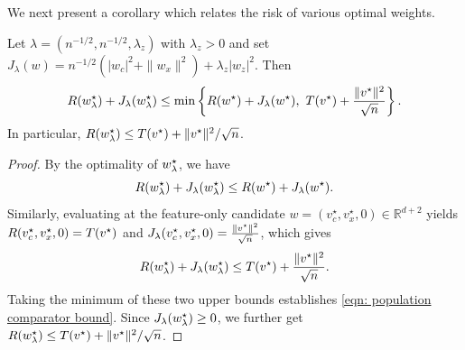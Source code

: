 We next present a corollary which relates the risk of various optimal weights.
\begin{cor}\label{cor: v star and w star infinity}
Let $\lambda=(n^{-1/2},n^{-1/2},\lambda_z)$ with $\lambda_z>0$ and set
$J_\lambda(w)=n^{-1/2}(|w_c|^2+\|w_x\|^2)+\lambda_z|w_z|^2$.
Then
\begin{equation}\label{eqn: population comparator bound}
R(w^\star_{\lambda})+J_\lambda(w^\star_{\lambda})
\leq\min\left\{
R(w^\star)+J_\lambda(w^\star),\
T(v^\star)+\frac{\|v^\star\|^2}{\sqrt n}\right\}.
\end{equation}
In particular,
$R(w^\star_{\lambda})\leq T(v^\star)+\|v^\star\|^2/\sqrt n$.
\end{cor}
\begin{proof}
By the optimality of $w^\star_{\lambda}$, we have  
\[
R(w^\star_{\lambda})+J_\lambda(w^\star_{\lambda})\leq R(w^\star)+J_\lambda(w^\star).
\]
Similarly, evaluating at the feature-only candidate $w=(v_c^\star,v_x^\star,0)\in\mathbb{R}^{d+2}$ yields $R(v_c^\star,v_x^\star,0)=T(v^\star)$ and $J_\lambda(v_c^\star,v_x^\star,0)=\frac{\|v^\star\|^2}{\sqrt{n}}$, which gives
\[
R(w^\star_{\lambda})+J_\lambda(w^\star_{\lambda})\leq T(v^\star)+\frac{\|v^\star\|^2}{\sqrt{n}}.
\]
Taking the minimum of these two upper bounds establishes \eqref{eqn: population comparator bound}. Since $J_\lambda(w^\star_{\lambda})\ge 0$, we further get $R(w^\star_{\lambda})\leq T(v^\star)+\|v^\star\|^2/\sqrt{n}$.
\end{proof}
